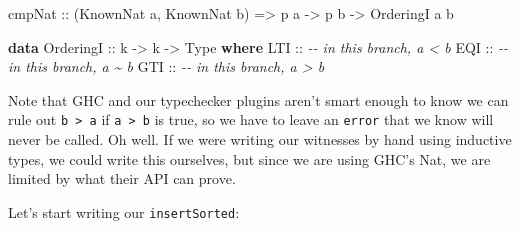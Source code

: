 \documentclass[]{article}
\newenvironment{Shaded}{}{}
\newcommand{\CommentTok}[1]{\textcolor[rgb]{0.38,0.63,0.69}{\textit{#1}}}
\newcommand{\DataTypeTok}[1]{\textcolor[rgb]{0.56,0.13,0.00}{#1}}
\newcommand{\KeywordTok}[1]{\textcolor[rgb]{0.00,0.44,0.13}{\textbf{#1}}}
\newcommand{\NormalTok}[1]{#1}
\newcommand{\OtherTok}[1]{\textcolor[rgb]{0.00,0.44,0.13}{#1}}
\begin{document}
\begin{Shaded}
\begin{Highlighting}[]
\OtherTok{cmpNat ::}\NormalTok{ (}\DataTypeTok{KnownNat}\NormalTok{ a, }\DataTypeTok{KnownNat}\NormalTok{ b) }\OtherTok{=\textgreater{}}\NormalTok{ p a }\OtherTok{{-}\textgreater{}}\NormalTok{ p b }\OtherTok{{-}\textgreater{}} \DataTypeTok{OrderingI}\NormalTok{ a b}

\KeywordTok{data} \DataTypeTok{OrderingI}\OtherTok{ ::}\NormalTok{ k }\OtherTok{{-}\textgreater{}}\NormalTok{ k }\OtherTok{{-}\textgreater{}} \DataTypeTok{Type} \KeywordTok{where}
    \DataTypeTok{LTI}\OtherTok{ ::} \CommentTok{{-}{-} in this branch, a \textless{} b}
    \DataTypeTok{EQI}\OtherTok{ ::} \CommentTok{{-}{-} in this branch, a \textasciitilde{} b}
    \DataTypeTok{GTI}\OtherTok{ ::} \CommentTok{{-}{-} in this branch, a \textgreater{} b}
\end{Highlighting}
\end{Shaded}

Note that GHC and our typechecker plugins aren't smart enough to know we can
rule out \texttt{b\ \textgreater{}\ a} if \texttt{a\ \textgreater{}\ b} is true,
so we have to leave an \texttt{error} that we know will never be called. Oh
well. If we were writing our witnesses by hand using inductive types, we could
write this ourselves, but since we are using GHC's Nat, we are limited by what
their API can prove.

Let's start writing our \texttt{insertSorted}:
\end{document}

